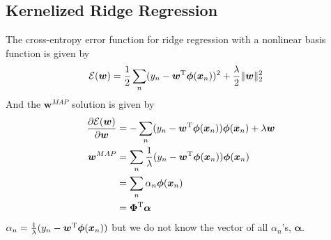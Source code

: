 \documentclass[11pt]{article}
\newcommand{\vct}[1]{\boldsymbol{#1}} %
\newcommand{\T}{^{\textrm T}} %
\begin{document}
\subsection{Kernelized Ridge Regression}
The cross-entropy error function for ridge regression with a nonlinear basis function is given by
\begin{align*}
\mathcal{E}(\vct{w}) &= \frac{1}{2}\sum_n(y_n - \vct{w}\T\vct{\phi}(\vct{x}_n))^2 + \frac{\lambda}{2}\|\vct{w}\|_2^2
\end{align*}
And the $\vct{w}^{MAP}$ solution is given by
\begin{align*}
\frac{\partial \mathcal{E}(\vct{w})}{\partial \vct{w}} &= -\sum_n(y_n - \vct{w}\T\vct{\phi}(\vct{x}_n))\vct{\phi}(\vct{x}_n) + \lambda\vct{w}\\
\vct{w}^{MAP} &= \sum_n \frac{1}{\lambda}(y_n - \vct{w}\T\vct{\phi}(\vct{x}_n))\vct{\phi}(\vct{x}_n)\\
&= \sum_n \alpha_n \vct{\phi}(\vct{x}_n) \\
&= \vct{\Phi}\T\vct{\alpha}
\end{align*}
$\alpha_n =  \frac{1}{\lambda}(y_n - \vct{w}\T\vct{\phi}(\vct{x}_n))$ but we do not know the vector of all $\alpha_n$'s, $\vct{\alpha}$.
\end{document}
